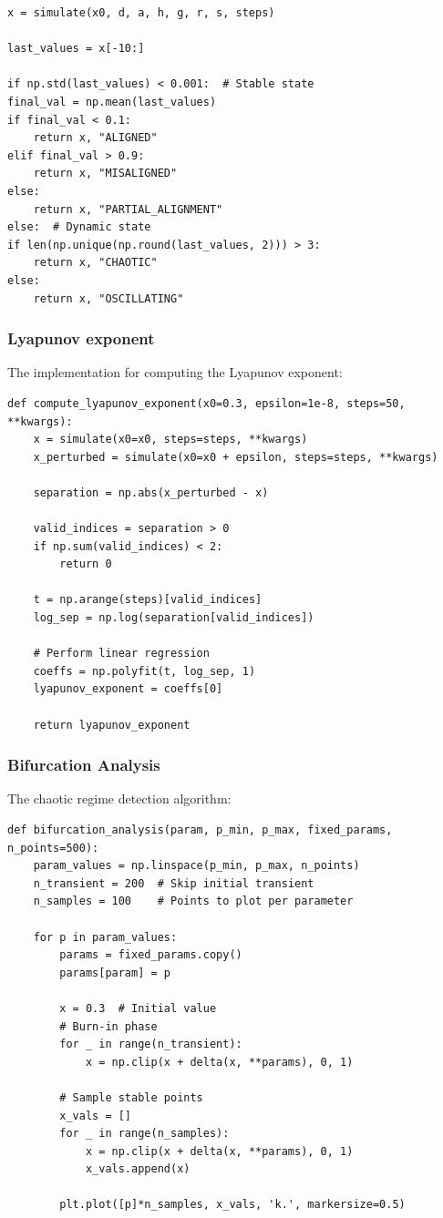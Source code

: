 \documentclass[a4paper, 10pt]{article}
\begin{document}
\begin{verbatim}
x = simulate(x0, d, a, h, g, r, s, steps)

last_values = x[-10:]

if np.std(last_values) < 0.001:  # Stable state
final_val = np.mean(last_values)
if final_val < 0.1:
    return x, "ALIGNED"
elif final_val > 0.9:
    return x, "MISALIGNED"
else:
    return x, "PARTIAL_ALIGNMENT"
else:  # Dynamic state
if len(np.unique(np.round(last_values, 2))) > 3:
    return x, "CHAOTIC"
else:
    return x, "OSCILLATING"
\end{verbatim}
\vspace{-3em}

\subsubsection{Lyapunov exponent}
The implementation for computing the Lyapunov exponent:

\begin{verbatim}
def compute_lyapunov_exponent(x0=0.3, epsilon=1e-8, steps=50, **kwargs):
    x = simulate(x0=x0, steps=steps, **kwargs)
    x_perturbed = simulate(x0=x0 + epsilon, steps=steps, **kwargs)

    separation = np.abs(x_perturbed - x)

    valid_indices = separation > 0
    if np.sum(valid_indices) < 2:
        return 0

    t = np.arange(steps)[valid_indices]
    log_sep = np.log(separation[valid_indices])

    # Perform linear regression
    coeffs = np.polyfit(t, log_sep, 1)
    lyapunov_exponent = coeffs[0]

    return lyapunov_exponent
\end{verbatim}
\vspace{-3em}

\subsubsection{Bifurcation Analysis}
The chaotic regime detection algorithm:

\begin{verbatim}
def bifurcation_analysis(param, p_min, p_max, fixed_params, n_points=500):
    param_values = np.linspace(p_min, p_max, n_points)
    n_transient = 200  # Skip initial transient
    n_samples = 100    # Points to plot per parameter
    
    for p in param_values:
        params = fixed_params.copy()
        params[param] = p
        
        x = 0.3  # Initial value
        # Burn-in phase
        for _ in range(n_transient):
            x = np.clip(x + delta(x, **params), 0, 1)
        
        # Sample stable points
        x_vals = []
        for _ in range(n_samples):
            x = np.clip(x + delta(x, **params), 0, 1)
            x_vals.append(x)
        
        plt.plot([p]*n_samples, x_vals, 'k.', markersize=0.5)
\end{verbatim}
\vspace{-3em}
\end{document}
